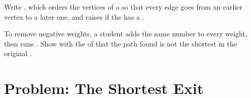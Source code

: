 \begin{exercise}[$\star\star\star$]\label{exo:g12:graph-algorithms:14}
Write , which orders the vertices of a  so that every edge goes from an
earlier vertex to a later one, and raises  if the  has a .
\end{exercise}

\begin{exercise}[$\star\star\star$]\label{exo:g12:graph-algorithms:15}
To remove negative weights, a student adds the same number to every weight, then runs . Show with
the  of  that the path found is not the shortest in the original .
\end{exercise}

\section{Problem: The Shortest Exit}\label{sec:g12:graph-algorithms:problem}

